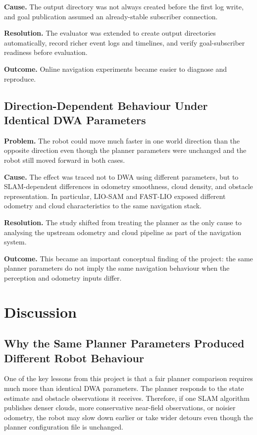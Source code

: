 \documentclass[12pt,a4paper]{report}
\begin{document}
\textbf{Cause.} The output directory was not always created before the first log write, and goal publication assumed an already-stable subscriber connection.

\textbf{Resolution.} The evaluator was extended to create output directories automatically, record richer event logs and timelines, and verify goal-subscriber readiness before evaluation.

\textbf{Outcome.} Online navigation experiments became easier to diagnose and reproduce.

\section{Direction-Dependent Behaviour Under Identical DWA Parameters}
\textbf{Problem.} The robot could move much faster in one world direction than the opposite direction even though the planner parameters were unchanged and the robot still moved forward in both cases.

\textbf{Cause.} The effect was traced not to DWA using different parameters, but to SLAM-dependent differences in odometry smoothness, cloud density, and obstacle representation. In particular, LIO-SAM and FAST-LIO exposed different odometry and cloud characteristics to the same navigation stack.

\textbf{Resolution.} The study shifted from treating the planner as the only cause to analysing the upstream odometry and cloud pipeline as part of the navigation system.

\textbf{Outcome.} This became an important conceptual finding of the project: the same planner parameters do not imply the same navigation behaviour when the perception and odometry inputs differ.

\chapter{Discussion}

\section{Why the Same Planner Parameters Produced Different Robot Behaviour}
One of the key lessons from this project is that a fair planner comparison requires much more than identical DWA parameters. The planner responds to the state estimate and obstacle observations it receives. Therefore, if one SLAM algorithm publishes denser clouds, more conservative near-field observations, or noisier odometry, the robot may slow down earlier or take wider detours even though the planner configuration file is unchanged.
\end{document}
